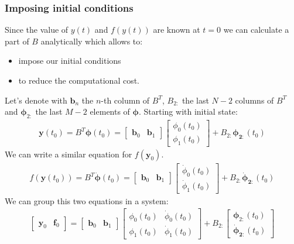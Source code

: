 \documentclass[11pt]{report}
\begin{document}
    \subsubsection{Imposing initial conditions}
    Since the value of $y(t)$ and $f(y(t))$ are known at $t=0$ we can calculate a part of $B$ analytically which
    allows to:
    \begin{itemize}
        \item impose our initial conditions
        \item to reduce the computational cost.
    \end{itemize}
    Let's denote with $\pmb{b}_n$ the $n$-th column of $B^T$, $B_{2:}$ the last $N-2$ columns of $B^T$ and $\pmb\phi_{2:}$ the last
    $M-2$ elements of $\pmb\phi$.
    Starting with initial state:
    \begin{align}
        \pmb{y}(t_0) = B^T \pmb\phi(t_0)
        =
        \begin{bmatrix}
            \pmb{b}_0 & \pmb{b}_1
        \end{bmatrix}
        \begin{bmatrix}
            \phi_0(t_0) \\ \phi_1(t_0)
        \end{bmatrix}
        + {B}_{2:} \pmb{\phi_{2:}}(t_0)
    \end{align}
    We can write a similar equation for $f(\pmb{y}_0)$.
    \begin{align}
        f(\pmb{y}(t_0)) = B^T \pmb{\dot\phi}(t_0)
        =
        \begin{bmatrix}
            \pmb{b}_0 & \pmb{b}_1
        \end{bmatrix}
        \begin{bmatrix}
            \dot\phi_0(t_0) \\ \dot\phi_1(t_0)
        \end{bmatrix}
        + {B}_{2:} \pmb{\dot\phi_{2:}}(t_0)
    \end{align}
    We can group this two equations in a system:
    \begin{align}
        \begin{bmatrix}
            \pmb{y}_0 & \pmb{f}_0
        \end{bmatrix} =
        \begin{bmatrix}
            \pmb{b}_0 & \pmb{b}_1
        \end{bmatrix}
        \begin{bmatrix}
            \phi_0(t_0) & \dot{\phi}_0(t_0) \\
            \phi_1(t_0) & \dot{\phi}_1(t_0)
        \end{bmatrix} +
        B_{2:}
        \begin{bmatrix}
            \pmb\phi_{2:}(t_0) \\ \pmb{\dot{\phi}_{2:}}(t_0)
        \end{bmatrix}
    \end{align}
\end{document}
